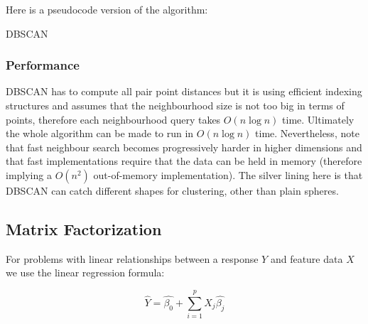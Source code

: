 Here is a pseudocode version of the algorithm:

\begin{algorithm}[H]
\SetAlgoLined
{}
\caption{DBSCAN}
\end{algorithm}



\subsubsection{Performance}
DBSCAN has to compute all pair point distances but it is using efficient indexing structures and assumes that the neighbourhood size is not too big in terms of points, therefore each neighbourhood query takes $O(n \log n)$ time. Ultimately the whole algorithm can be made to run in $O(n \log n)$ time. Nevertheless, note that fast neighbour search becomes progressively harder in higher dimensions and that fast implementations require that the data can be held in memory (therefore implying a $O(n^{2})$ out-of-memory implementation). The silver lining here is that DBSCAN can catch different shapes for clustering, other than plain spheres.

\subsection{Matrix Factorization}
For problems with linear relationships between a response $Y$ and feature data $X$ we use the linear regression formula:

$$ \hat{Y} = \hat{\beta_{0}} + \sum_{i=1}^{p} X_{j}  \hat{\beta_{j}} $$

